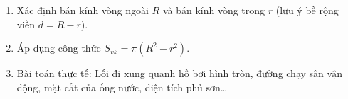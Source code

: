 \begin{enumerate}
\item Xác định bán kính vòng ngoài $R$ và bán kính vòng trong $r$ (lưu ý bề rộng viền $d = R - r$).
\item Áp dụng công thức $S_{vk} = \pi (R^2 - r^2)$.
\item Bài toán thực tế: Lối đi xung quanh hồ bơi hình tròn, đường chạy sân vận động, mặt cắt của ống nước, diện tích phủ sơn\dots
\end{enumerate}
